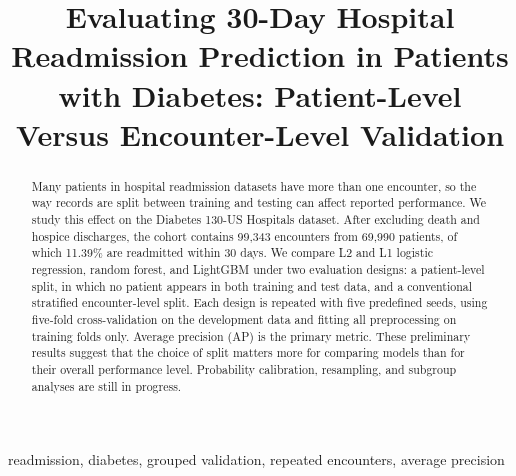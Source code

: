 \documentclass[conference]{IEEEtran}
\begin{document}
\title{Evaluating 30-Day Hospital Readmission Prediction in Patients with Diabetes: Patient-Level Versus Encounter-Level Validation}
\author{
\and{}
\and{}
}
\maketitle
\begin{abstract}
Many patients in hospital readmission datasets have more than one encounter, so the way records are split between training and testing can affect reported performance. We study this effect on the Diabetes 130-US Hospitals dataset. After excluding death and hospice discharges, the cohort contains 99,343 encounters from 69,990 patients, of which 11.39\% are readmitted within 30 days. We compare L2 and L1 logistic regression, random forest, and LightGBM under two evaluation designs: a patient-level split, in which no patient appears in both training and test data, and a conventional stratified encounter-level split. Each design is repeated with five predefined seeds, using five-fold cross-validation on the development data and fitting all preprocessing on training folds only. Average precision (AP) is the primary metric.  These preliminary results suggest that the choice of split matters more for comparing models than for their overall performance level. Probability calibration, resampling, and subgroup analyses are still in progress.
\end{abstract}
\begin{IEEEkeywords}
readmission, diabetes, grouped validation, repeated encounters, average precision
\end{IEEEkeywords}
\end{document}
